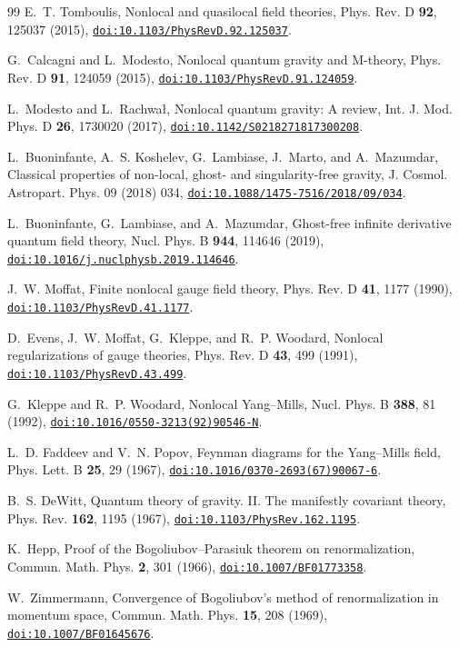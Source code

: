 \documentclass[aps,prd,10pt,twocolumn,superscriptaddress,nofootinbib,floatfix,longbibliography]{revtex4-2}
\newcommand{\doilink}[1]{\href{https://doi.org/#1}{\nolinkurl{doi:#1}}}
\begin{document}
\begin{thebibliography}{99}
E.~T. Tomboulis, Nonlocal and quasilocal field theories, Phys. Rev. D \textbf{92}, 125037 (2015), \doilink{10.1103/PhysRevD.92.125037}.

G.~Calcagni and L.~Modesto, Nonlocal quantum gravity and M-theory, Phys. Rev. D \textbf{91}, 124059 (2015), \doilink{10.1103/PhysRevD.91.124059}.

L.~Modesto and L.~Rachwa{\l}, Nonlocal quantum gravity: A review, Int. J. Mod. Phys. D \textbf{26}, 1730020 (2017), \doilink{10.1142/S0218271817300208}.

L.~Buoninfante, A.~S. Koshelev, G.~Lambiase, J.~Marto, and A.~Mazumdar, Classical properties of non-local, ghost- and singularity-free gravity, J. Cosmol. Astropart. Phys. 09 (2018) 034, \doilink{10.1088/1475-7516/2018/09/034}.

L.~Buoninfante, G.~Lambiase, and A.~Mazumdar, Ghost-free infinite derivative quantum field theory, Nucl. Phys. B \textbf{944}, 114646 (2019), \doilink{10.1016/j.nuclphysb.2019.114646}.

J.~W. Moffat, Finite nonlocal gauge field theory, Phys. Rev. D \textbf{41}, 1177 (1990), \doilink{10.1103/PhysRevD.41.1177}.

D.~Evens, J.~W. Moffat, G.~Kleppe, and R.~P. Woodard, Nonlocal regularizations of gauge theories, Phys. Rev. D \textbf{43}, 499 (1991), \doilink{10.1103/PhysRevD.43.499}.

G.~Kleppe and R.~P. Woodard, Nonlocal Yang--Mills, Nucl. Phys. B \textbf{388}, 81 (1992), \doilink{10.1016/0550-3213(92)90546-N}.

L.~D. Faddeev and V.~N. Popov, Feynman diagrams for the Yang--Mills field, Phys. Lett. B \textbf{25}, 29 (1967), \doilink{10.1016/0370-2693(67)90067-6}.

B.~S. DeWitt, Quantum theory of gravity. II. The manifestly covariant theory, Phys. Rev. \textbf{162}, 1195 (1967), \doilink{10.1103/PhysRev.162.1195}.

K.~Hepp, Proof of the Bogoliubov--Parasiuk theorem on renormalization, Commun. Math. Phys. \textbf{2}, 301 (1966), \doilink{10.1007/BF01773358}.

W.~Zimmermann, Convergence of Bogoliubov's method of renormalization in momentum space, Commun. Math. Phys. \textbf{15}, 208 (1969), \doilink{10.1007/BF01645676}.


\end{thebibliography}
\end{document}

